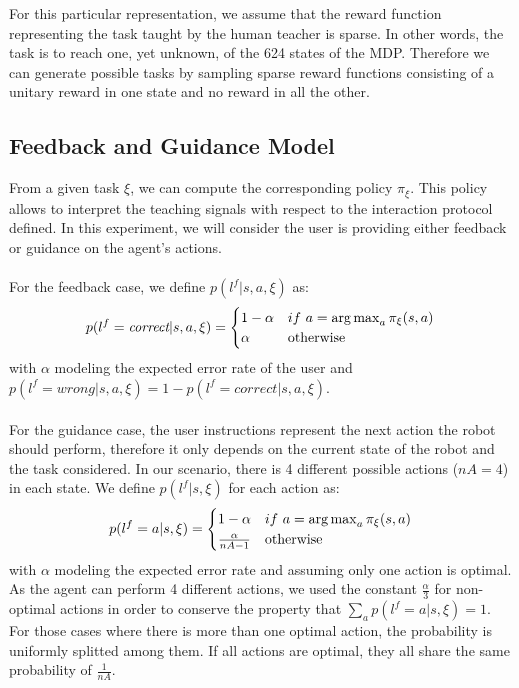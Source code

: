 For this particular representation, we assume that the reward function representing the task taught by the human teacher is sparse. In other words, the task is to reach one, yet unknown, of the 624 states of the MDP. Therefore we can generate possible tasks by sampling sparse reward functions consisting of a unitary reward in one state and no reward in all the other.

\subsection{Feedback and Guidance Model}
\label{chapter:lfui:framemodels}

From a given task $\xi$, we can compute the corresponding policy $\pi_{\xi}$. This policy allows to interpret the teaching signals with respect to the interaction protocol defined. In this experiment, we will consider the user is providing either feedback or guidance on the agent's actions. 

\paragraph{} For the feedback case, we define $p(l^f |s,a,\xi)$ as:
%
\begin{equation}
    p(l^f = \emph{correct} |s,a,\xi) = 
    \begin{cases}
    1-\alpha               & if~a = \argmax_a \pi_{\xi}(s,a)\\
        \alpha             & \text{otherwise}\\
   \end{cases}
   \label{eq:feedbackframe}
\end{equation}
%
with $\alpha$ modeling the expected error rate of the user and $p(l^f = wrong |s,a,\xi) = 1 - p(l^f = correct |s,a,\xi)$.

\paragraph{} For the guidance case, the user instructions represent the next action the robot should perform, therefore it only depends on the current state of the robot and the task considered. In our scenario, there is 4 different possible actions ($nA = 4$) in each state. We define $p(l^f |s, \xi)$ for each action as:
%
\begin{equation}
    p(l^f = a |s,\xi) = 
    \begin{cases}
        1-\alpha & if~a = \argmax_a \pi_{\xi}(s,a)\\
        \frac{\alpha}{nA-1} & \text{otherwise}\\
   \end{cases}
   \label{eq:guidanceframe}
\end{equation}
%
with $\alpha$ modeling the expected error rate and assuming only one action is optimal. As the agent can perform 4 different actions, we used the constant $\frac{\alpha}{3}$ for non-optimal actions in order to conserve the property that $\sum_a p(l^f = a |s,\xi) = 1$. For those cases where there is more than one optimal action, the probability is uniformly splitted among them. If all actions are optimal, they all share the same probability of $\frac{1}{nA}$.

